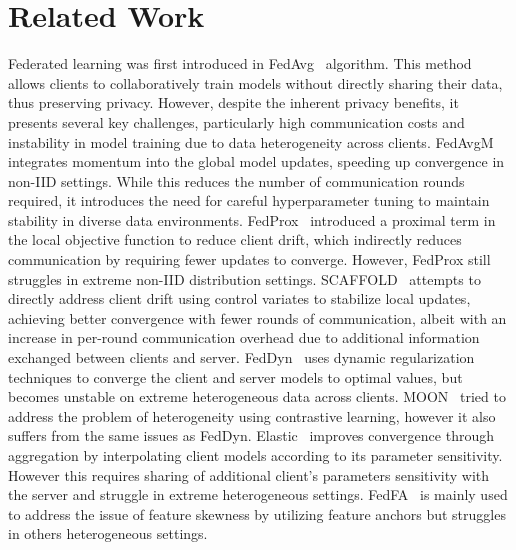 \documentclass[lettersize,journal]{IEEEtran}
\begin{document}
\section{Related Work}
\label{related-works}

Federated learning was first introduced in FedAvg~\cite{mcmahan2017communication} algorithm. This method allows clients to collaboratively train models without directly sharing their data, thus preserving privacy. However, despite the inherent privacy benefits, it presents several key challenges, particularly high communication costs and instability in model training due to data heterogeneity across clients. FedAvgM~\cite{hsu2019measuring} integrates momentum into the global model updates, speeding up convergence in non-IID settings. While this reduces the number of communication rounds required, it introduces the need for careful hyperparameter tuning to maintain stability in diverse data environments. FedProx~\cite{li2020federated} introduced a proximal term in the local objective function to reduce client drift, which indirectly reduces communication by requiring fewer updates to converge. However, FedProx still struggles in extreme non-IID distribution settings. SCAFFOLD~\cite{karimireddy2020scaffold} attempts to directly address client drift using control variates to stabilize local updates, achieving better convergence with fewer rounds of communication, albeit with an increase in per-round communication overhead due to additional information exchanged between clients and server. FedDyn~\cite{acar2021federated} uses dynamic regularization techniques to converge the client and server models to optimal values, but becomes unstable on extreme heterogeneous data across clients. MOON~\cite{li2021model} tried to address the problem of heterogeneity using contrastive learning, however it also suffers from the same issues as FedDyn. Elastic~\cite{Chen_2023_CVPR} improves convergence through aggregation by interpolating client models according to its parameter sensitivity. However this requires sharing of additional client's parameters sensitivity with the server and struggle in extreme heterogeneous settings. FedFA~\cite{10286887} is mainly used to address the issue of feature skewness by utilizing feature anchors but struggles in others heterogeneous settings.
\end{document}

